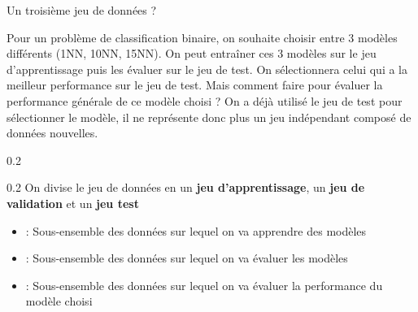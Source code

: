 \documentclass[10pt]{beamer}
\begin{document}
\begin{frame}{Un troisième jeu de données ?}
	
	
%	
	Pour un problème de classification binaire, on souhaite choisir entre $3$ modèles différents (\eg 1NN, 10NN, 15NN). 
	On peut entraîner ces $3$ modèles sur le jeu d'apprentissage puis les évaluer sur le jeu de test. On sélectionnera celui qui a la meilleur performance sur le jeu de test. Mais comment faire pour évaluer la performance générale de ce modèle choisi ? On a déjà utilisé le jeu de test pour sélectionner le modèle, il ne représente donc plus un jeu indépendant composé de données nouvelles.
	
	\begin{minipc}[0.06]{0.2}
		\raisebox{1.5mm}{\bclampe \xspace} 
	\end{minipc}
	\begin{minipc}[0.93]{0.2}
	On divise le jeu de données en un \textbf{jeu d'apprentissage}, un \textbf{jeu de validation} et un \textbf{jeu test} 
	\end{minipc}
	
	\begin{itemize}
		\item {} : Sous-ensemble des données sur lequel on va apprendre des modèles\\[0.5em] 
		\item {} : Sous-ensemble des données sur lequel on va évaluer les modèles
		\item {} : Sous-ensemble des données sur lequel on va évaluer la performance du modèle choisi
		 \\[0.5em] 
	\end{itemize}
\end{frame}
\end{document}
